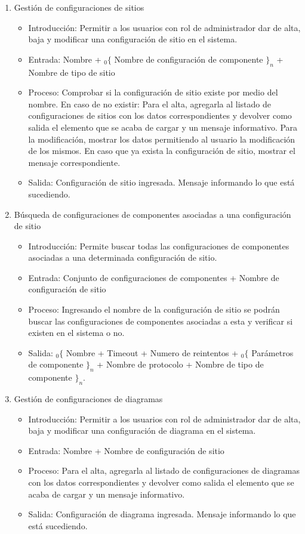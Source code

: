 \begin{enumerate}
			\item Gestión de configuraciones de sitios
				\begin{itemize}
					\item Introducción: Permitir a los usuarios con rol de administrador dar de alta, baja y modificar una configuración de sitio en el sistema.
					\item Entrada: Nombre + ${}_{0}\{$ Nombre de configuración de componente  $\}_n$ + Nombre de tipo de sitio
					\item Proceso: Comprobar si la configuración de sitio existe por medio del nombre. En caso de no existir:
					Para el alta, agregarla al listado de configuraciones de sitios con los datos correspondientes y devolver como salida el elemento que se acaba de cargar y un mensaje informativo.
					Para la modificación, mostrar los datos permitiendo al usuario la modificación de los mismos.
					En caso que ya exista la configuración de sitio, mostrar el mensaje correspondiente.
					\item Salida: Configuración de sitio ingresada. Mensaje informando lo que está sucediendo.
				\end{itemize}
				
			\item Búsqueda de configuraciones de componentes asociadas a una configuración de sitio
				\begin{itemize}
					\item Introducción: Permite buscar todas las configuraciones de componentes asociadas a una determinada configuración de sitio.
					\item Entrada: Conjunto de configuraciones de componentes + Nombre de configuración de sitio
					\item Proceso: Ingresando el nombre de la configuración de sitio se podrán buscar las configuraciones de componentes asociadas a esta y verificar si existen en el sistema o no.
					\item Salida: ${}_{0}\{$ Nombre + Timeout + Numero de reintentos + ${}_{0}\{$ Parámetros de componente $\}_n$  + Nombre de protocolo + Nombre de tipo de componente $\}_n$.
				\end{itemize}
					
			\item Gestión de configuraciones de diagramas
				\begin{itemize}
					\item Introducción: Permitir a los usuarios con rol de administrador dar de alta, baja y modificar una configuración de diagrama en el sistema.
					\item Entrada: Nombre + Nombre de configuración de sitio
					\item Proceso: Para el alta, agregarla al listado de configuraciones de diagramas con los datos correspondientes y devolver como salida el elemento que se acaba de cargar y un mensaje informativo.
					\item Salida: Configuración de diagrama ingresada. Mensaje informando lo que está sucediendo.
				\end{itemize}
				

\end{enumerate}
